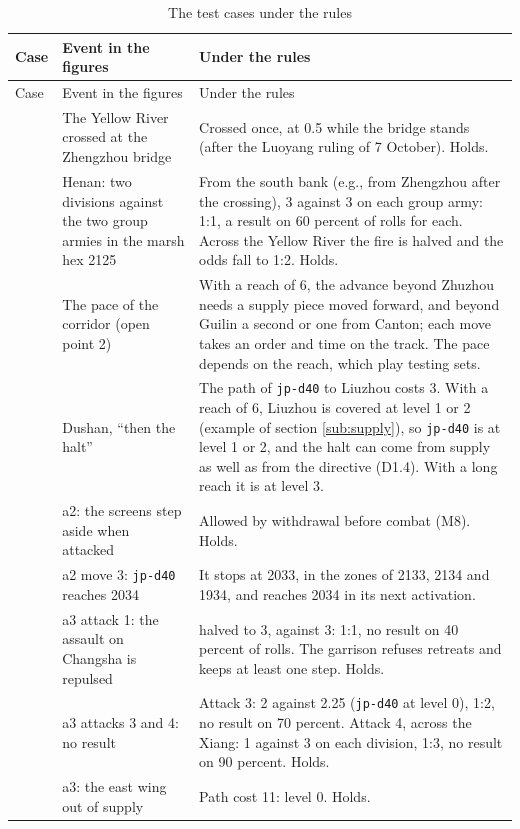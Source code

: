 \documentclass[11pt]{article}
\begin{document}
{\small
\begin{longtable}{@{}>{\raggedright\arraybackslash}p{}>{\raggedright\arraybackslash}p{}>{\raggedright\arraybackslash}p{}@{}}
\caption{The test cases under the rules}\label{tab:checks}\\
\toprule
Case & Event in the figures & Under the rules \\
\midrule
\endfirsthead
\toprule
Case & Event in the figures & Under the rules \\
\midrule
\endhead
\bottomrule
\endfoot
1 & The Yellow River crossed at the Zhengzhou bridge & Crossed once, at 0.5 while the bridge stands (after the Luoyang ruling of 7 October). Holds. \\
1 & Henan: two divisions against the two group armies in the marsh hex 2125 & From the south bank (e.g., from Zhengzhou after the crossing), 3 against 3 on each group army: 1:1, a result on 60 percent of rolls for each. Across the Yellow River the fire is halved and the odds fall to 1:2. Holds. \\
1 & The pace of the corridor (open point 2) & With a reach of 6, the advance beyond Zhuzhou needs a supply piece moved forward, and beyond Guilin a second or one from Canton; each move takes an order and time on the track. The pace depends on the reach, which play testing sets. \\
1 & Dushan, ``then the halt'' & The path of \texttt{jp-d40} to Liuzhou costs 3. With a reach of 6, Liuzhou is covered at level 1 or 2 (example of section \ref{sub:supply}), so \texttt{jp-d40} is at level 1 or 2, and the halt can come from supply as well as from the directive (D1.4). With a long reach it is at level 3. \\
2 & a2: the screens step aside when attacked & Allowed by withdrawal before combat (M8). Holds. \\
2 & a2 move 3: \texttt{jp-d40} reaches 2034 & It stops at 2033, in the zones of 2133, 2134 and 1934, and reaches 2034 in its next activation. \\
2 & a3 attack 1: the assault on Changsha is repulsed & 6 halved to 3, against 3: 1:1, no result on 40 percent of rolls. The garrison refuses retreats and keeps at least one step. Holds. \\
2 & a3 attacks 3 and 4: no result & Attack 3: 2 against 2.25 (\texttt{jp-d40} at level 0), 1:2, no result on 70 percent. Attack 4, across the Xiang: 1 against 3 on each division, 1:3, no result on 90 percent. Holds. \\
2 & a3: the east wing out of supply & Path cost 11: level 0. Holds. \\

\end{longtable}}
\end{document}
